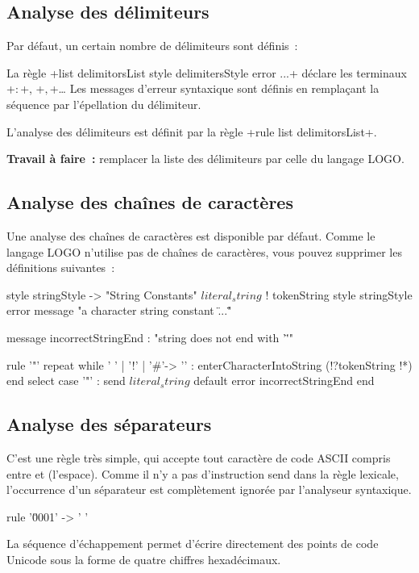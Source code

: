 \subsection{Analyse des délimiteurs}
Par défaut, un certain nombre de délimiteurs sont définis~:


La règle \ggst+list delimitorsList style delimitersStyle error ...+ déclare les terminaux \ggst+$:$+, \ggst+$,$+… Les messages d'erreur syntaxique sont définis en remplaçant la séquence  par l’épellation du délimiteur.

L'analyse des délimiteurs est définit par la règle \ggst+rule list delimitorsList+.

\textbf{Travail à faire~:} remplacer la liste des délimiteurs par celle du langage LOGO.

\subsection{Analyse des chaînes de caractères}
Une analyse des chaînes de caractères est disponible par défaut. Comme le langage LOGO n’utilise pas de chaînes de caractères, vous pouvez supprimer les définitions suivantes~:

\begin{galgas3}
style stringStyle -> "String Constants"
$literal_string$ ! tokenString style stringStyle %
                   error message "a character string constant \"...\""

message incorrectStringEnd : "string does not end with '\"'"

rule '"' {
  repeat
  while ' ' | '!' | '#'-> '\uFFFD' :
    enterCharacterIntoString (!?tokenString !*)
  end
  select
  case '"' :
    send $literal_string$
  default
    error incorrectStringEnd
  end
}
\end{galgas3}

\subsection{Analyse des séparateurs}
C'est une règle très simple, qui accepte tout caractère de code ASCII compris entre  et  (l'espace). Comme il n'y a pas d'instruction send dans la règle lexicale, l'occurrence d'un séparateur est complètement ignorée par l'analyseur syntaxique.
\begin{galgas3}
rule '\u0001' -> ' ' {
}
\end{galgas3}
La séquence d'échappement  permet d'écrire directement des points de code Unicode sous la forme de quatre chiffres hexadécimaux.

